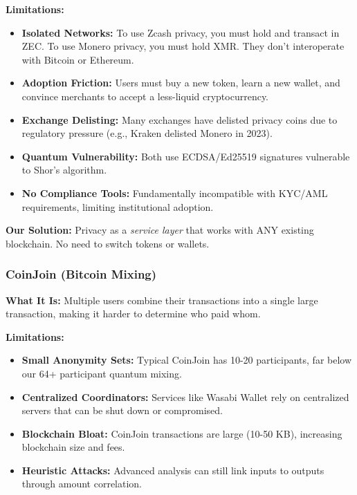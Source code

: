 \documentclass[11pt,a4paper]{article}
\begin{document}
\textbf{Limitations:}
\begin{itemize}
    \item \textbf{Isolated Networks:} To use Zcash privacy, you must hold and transact in ZEC. To use Monero privacy, you must hold XMR. They don't interoperate with Bitcoin or Ethereum.

    \item \textbf{Adoption Friction:} Users must buy a new token, learn a new wallet, and convince merchants to accept a less-liquid cryptocurrency.

    \item \textbf{Exchange Delisting:} Many exchanges have delisted privacy coins due to regulatory pressure (e.g., Kraken delisted Monero in 2023).

    \item \textbf{Quantum Vulnerability:} Both use ECDSA/Ed25519 signatures vulnerable to Shor's algorithm.

    \item \textbf{No Compliance Tools:} Fundamentally incompatible with KYC/AML requirements, limiting institutional adoption.
\end{itemize}

\textbf{Our Solution:} Privacy as a \textit{service layer} that works with ANY existing blockchain. No need to switch tokens or wallets.

\subsubsection{CoinJoin (Bitcoin Mixing)}

\textbf{What It Is:} Multiple users combine their transactions into a single large transaction, making it harder to determine who paid whom.

\textbf{Limitations:}
\begin{itemize}
    \item \textbf{Small Anonymity Sets:} Typical CoinJoin has 10-20 participants, far below our 64+ participant quantum mixing.

    \item \textbf{Centralized Coordinators:} Services like Wasabi Wallet rely on centralized servers that can be shut down or compromised.

    \item \textbf{Blockchain Bloat:} CoinJoin transactions are large (10-50 KB), increasing blockchain size and fees.

    \item \textbf{Heuristic Attacks:} Advanced analysis can still link inputs to outputs through amount correlation.
\end{itemize}
\end{document}
